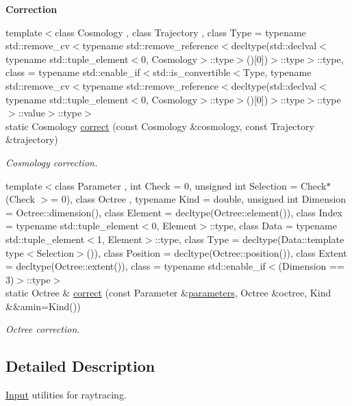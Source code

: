 \begin{Indent}{\bf Correction}\par
\begin{DoxyCompactItemize}
\item 
{\footnotesize template$<$class Cosmology , class Trajectory , class Type  = typename std\-::remove\-\_\-cv$<$typename std\-::remove\-\_\-reference$<$decltype(std\-::declval$<$typename std\-::tuple\-\_\-element$<$0, Cosmology$>$\-::type$>$()\mbox{[}0\mbox{]})$>$\-::type$>$\-::type, class  = typename std\-::enable\-\_\-if$<$std\-::is\-\_\-convertible$<$\-Type, typename std\-::remove\-\_\-cv$<$typename std\-::remove\-\_\-reference$<$decltype(std\-::declval$<$typename std\-::tuple\-\_\-element$<$0, Cosmology$>$\-::type$>$()\mbox{[}0\mbox{]})$>$\-::type$>$\-::type$>$\-::value$>$\-::type$>$ }\\static Cosmology \hyperlink{exceptionInput_a8a4d7f0c08ed5566f38d3c5fe39ed1f2}{correct} (const Cosmology \&cosmology, const Trajectory \&trajectory)
\begin{DoxyCompactList}\small\item\em Cosmology correction. \end{DoxyCompactList}\item 
{\footnotesize template$<$class Parameter , int Check = 0, unsigned int Selection = Check$\ast$(\-Check $>$= 0), class Octree , typename Kind  = double, unsigned int Dimension = Octree\-::dimension(), class Element  = decltype(\-Octree\-::element()), class Index  = typename std\-::tuple\-\_\-element$<$0, Element$>$\-::type, class Data  = typename std\-::tuple\-\_\-element$<$1, Element$>$\-::type, class Type  = decltype(\-Data\-::template type$<$\-Selection$>$()), class Position  = decltype(\-Octree\-::position()), class Extent  = decltype(\-Octree\-::extent()), class  = typename std\-::enable\-\_\-if$<$(\-Dimension == 3)$>$\-::type$>$ }\\static Octree \& \hyperlink{exceptionInput_a19b129e06c227ee65c11577030f4ac36}{correct} (const Parameter \&\hyperlink{rays_8h_ae1bc8b0b8c8b9f8e4cc61a5cc7c4ce9e}{parameters}, Octree \&octree, Kind \&\&amin=Kind())
\begin{DoxyCompactList}\small\item\em Octree correction. \end{DoxyCompactList}\end{DoxyCompactItemize}
\end{Indent}


\subsection{Detailed Description}
\hyperlink{exceptionInput}{Input} utilities for raytracing. 

